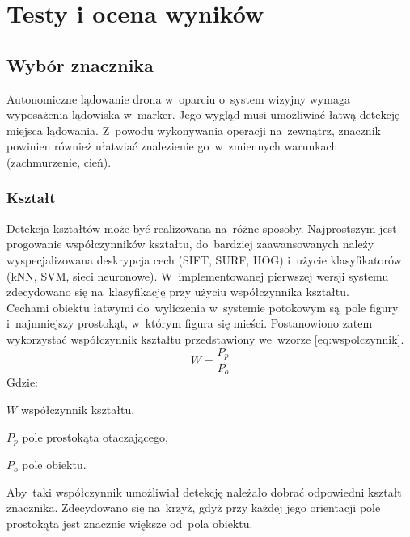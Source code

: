 \chapter{Testy i ocena wyników}
\label{cha:testy_i_ocena_wynikow}


\section{Wybór znacznika} 
\label{sec:wybor_znacznika}
Autonomiczne lądowanie drona w~oparciu o~system wizyjny wymaga wyposażenia lądowiska w~marker. Jego wygląd musi umożliwiać łatwą detekcję miejsca lądowania. Z~powodu wykonywania operacji na~zewnątrz, znacznik powinien również ułatwiać znalezienie go~w~zmiennych warunkach (zachmurzenie, cień).
\subsection{Kształt}
\label{subsec:ksztalt} 
Detekcja kształtów może być realizowana na~różne sposoby. Najprostszym jest progowanie współczynników kształtu, do~bardziej zaawansowanych należy wyspecjalizowana deskrypcja cech (SIFT, SURF, HOG) i~użycie klasyfikatorów (kNN, SVM, sieci neuronowe). W~implementowanej pierwszej wersji systemu zdecydowano się na~klasyfikację przy użyciu współczynnika kształtu.\\
Cechami obiektu łatwymi do~wyliczenia w~systemie potokowym są~pole figury i~najmniejszy prostokąt, w~którym figura się mieści. Postanowiono zatem wykorzystać współczynnik kształtu przedstawiony we~wzorze \ref{eq:wspolczynnik}.\\
\begin{equation} \label{eq:wspolczynnik}
W=\frac{P_p}{P_o}
\end{equation}
Gdzie:
\begin{eqwhere}[2cm]
	\item[$W$] współczynnik kształtu,
	\item[$P_p$] pole prostokąta otaczającego,
	\item[$P_o$] pole obiektu.
\end{eqwhere}
Aby~taki współczynnik umożliwiał detekcję należało dobrać odpowiedni kształt znacznika. Zdecydowano się na~krzyż, gdyż przy każdej jego orientacji pole prostokąta jest znacznie większe od~pola obiektu.
